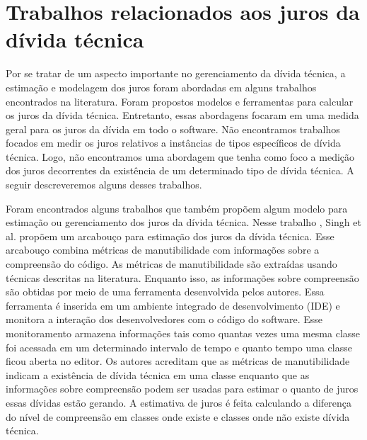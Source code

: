 \section{Trabalhos relacionados aos juros da dívida técnica}
\label{modelos_existentes}

Por se tratar de um aspecto importante no gerenciamento da dívida técnica, a estimação e modelagem dos juros foram abordadas em alguns trabalhos encontrados na literatura. Foram propostos modelos e ferramentas para calcular os juros da dívida técnica. Entretanto, essas abordagens focaram em uma medida geral para os juros da dívida em todo o software. Não encontramos trabalhos focados em medir os juros relativos a instâncias de tipos específicos de dívida técnica. Logo, não encontramos uma abordagem que tenha como foco a medição dos juros decorrentes da existência de um determinado tipo de dívida técnica. A seguir descreveremos alguns desses trabalhos.

Foram encontrados alguns trabalhos que também propõem algum modelo para estimação ou gerenciamento dos juros da dívida técnica. Nesse trabalho \cite{singh2014framework}, Singh et al. propõem um arcabouço para estimação dos juros da dívida técnica. Esse arcabouço combina métricas de manutibilidade com informações 
sobre a compreensão do código. As métricas de manutibilidade são extraídas usando técnicas descritas na literatura.  Enquanto isso, as informações sobre 
compreensão são obtidas por meio de uma ferramenta desenvolvida pelos autores. Essa ferramenta é inserida em um ambiente integrado 
de desenvolvimento (IDE) e monitora a interação dos desenvolvedores com o código do software. Esse monitoramento armazena informações tais como quantas vezes uma mesma classe foi
acessada em um determinado intervalo de tempo e quanto tempo uma classe ficou aberta no editor. Os autores acreditam que as métricas de manutibilidade indicam a 
existência de dívida técnica em uma classe enquanto que as informações sobre compreensão podem ser usadas para estimar o quanto de juros essas dívidas estão 
gerando. A estimativa de juros é feita calculando a diferença do nível de compreensão em classes onde existe e classes onde não existe dívida técnica.

